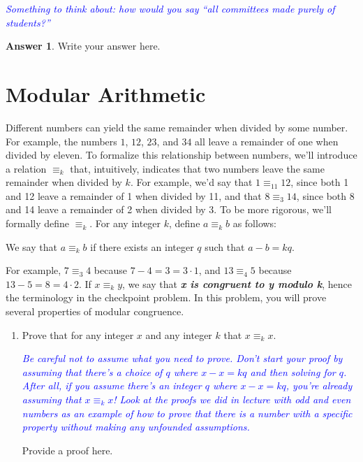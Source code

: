 \documentclass{article}
\renewcommand{\(}{\left(}
\renewcommand{\)}{\right)}
\theoremstyle{plain}
\theoremstyle{plain}
\theoremstyle{definition}
\newtheorem*{answer}{Answer}
\begin{document}
\begin{enumerate}[label*=\roman*.,ref=\roman*]
\textit{\textcolor{blue}{Something to think about: how would you say ``all committees made purely of students?'' }}

\begin{shaded}
\begin{answer}
Write your answer here.
\end{answer}
\end{shaded}

\end{enumerate}

\section{Modular Arithmetic}

Different numbers can yield the same remainder when divided by some number.
For example,
the numbers $1$, $12$, $23$, and $34$ all leave a remainder of one
when divided by eleven.
To formalize this relationship between numbers,
we'll introduce a relation $\equiv_k$ that, intuitively,
indicates that two numbers leave the same remainder when divided by $k$.
For example,
we'd say that $1 \equiv_{11} 12$, since both 1 and 12 leave a
remainder of 1 when divided by 11, and that $8\equiv_3 14$, 
since both 8 and 14 leave a remainder of 2 when
divided by 3. To be more rigorous, we'll formally define $\equiv_k$.
For any integer $k$,
define $a \equiv_k b$ as follows:
\begin{center}
We say that $a \equiv_k b$ if there exists an integer $q$ such that
$a - b = kq$.
\end{center}
For example, $7 \equiv_3 4$ because $7 - 4 = 3 = 3 \cdot 1$,
and $13 \equiv_4 5$ because $13 - 5 = 8 = 4 \cdot 2$.
If $x \equiv_k y$,
we say that \textit{\textbf{x is congruent to y modulo k}},
hence the terminology in the checkpoint problem.
In this problem, you will prove several properties of modular congruence.

\begin{enumerate}[label*=\roman*.,ref=\roman*]

\item Prove that for any integer $x$ and any integer $k$
that $x \equiv_k x$.

\textit{\textcolor{blue}{ Be careful not to assume what you need to prove. Don't start your proof by assuming that there's a choice of $q$ where $x - x = kq$ and then solving for $q$. After all, if you assume there's an integer $q$ where $x - x = kq$, you're already assuming that $x \equiv_k x$! Look at the proofs we did in lecture with odd and even numbers as an example
of how to prove that there is a number with a specific property without making any unfounded assumptions. }}

\begin{shaded}
Provide a proof here.
\end{shaded}

\end{enumerate}
\end{document}
